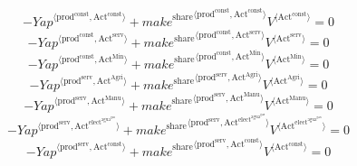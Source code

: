 \begin{equation}
-{{Y\!a\!p}}^{\langle \mathrm{prod}^{\mathrm{const}},\mathrm{Act}^{\mathrm{const}}\rangle} + {{{m\!a\!k\!e}^{\mathrm{share}}}^{\langle \mathrm{\mathrm{prod}^{\mathrm{const}}},\mathrm{\mathrm{Act}^{\mathrm{const}}}\rangle}} {{V}^{\langle \mathrm{Act}^{\mathrm{const}}\rangle}} = 0
\end{equation}
\begin{equation}
-{{Y\!a\!p}}^{\langle \mathrm{prod}^{\mathrm{const}},\mathrm{Act}^{\mathrm{serv}}\rangle} + {{{m\!a\!k\!e}^{\mathrm{share}}}^{\langle \mathrm{\mathrm{prod}^{\mathrm{const}}},\mathrm{\mathrm{Act}^{\mathrm{serv}}}\rangle}} {{V}^{\langle \mathrm{Act}^{\mathrm{serv}}\rangle}} = 0
\end{equation}
\begin{equation}
-{{Y\!a\!p}}^{\langle \mathrm{prod}^{\mathrm{const}},\mathrm{Act}^{\mathrm{Min}}\rangle} + {{{m\!a\!k\!e}^{\mathrm{share}}}^{\langle \mathrm{\mathrm{prod}^{\mathrm{const}}},\mathrm{\mathrm{Act}^{\mathrm{Min}}}\rangle}} {{V}^{\langle \mathrm{Act}^{\mathrm{Min}}\rangle}} = 0
\end{equation}
\begin{equation}
-{{Y\!a\!p}}^{\langle \mathrm{prod}^{\mathrm{serv}},\mathrm{Act}^{\mathrm{Agri}}\rangle} + {{{m\!a\!k\!e}^{\mathrm{share}}}^{\langle \mathrm{\mathrm{prod}^{\mathrm{serv}}},\mathrm{\mathrm{Act}^{\mathrm{Agri}}}\rangle}} {{V}^{\langle \mathrm{Act}^{\mathrm{Agri}}\rangle}} = 0
\end{equation}
\begin{equation}
-{{Y\!a\!p}}^{\langle \mathrm{prod}^{\mathrm{serv}},\mathrm{Act}^{\mathrm{Manu}}\rangle} + {{{m\!a\!k\!e}^{\mathrm{share}}}^{\langle \mathrm{\mathrm{prod}^{\mathrm{serv}}},\mathrm{\mathrm{Act}^{\mathrm{Manu}}}\rangle}} {{V}^{\langle \mathrm{Act}^{\mathrm{Manu}}\rangle}} = 0
\end{equation}
\begin{equation}
-{{Y\!a\!p}}^{\langle \mathrm{prod}^{\mathrm{serv}},\mathrm{Act}^{\mathrm{elect}^{\mathrm{agua}^{\mathrm{gas}}}}\rangle} + {{{m\!a\!k\!e}^{\mathrm{share}}}^{\langle \mathrm{\mathrm{prod}^{\mathrm{serv}}},\mathrm{\mathrm{Act}^{\mathrm{elect}^{\mathrm{agua}^{\mathrm{gas}}}}}\rangle}} {{V}^{\langle \mathrm{Act}^{\mathrm{elect}^{\mathrm{agua}^{\mathrm{gas}}}}\rangle}} = 0
\end{equation}
\begin{equation}
-{{Y\!a\!p}}^{\langle \mathrm{prod}^{\mathrm{serv}},\mathrm{Act}^{\mathrm{const}}\rangle} + {{{m\!a\!k\!e}^{\mathrm{share}}}^{\langle \mathrm{\mathrm{prod}^{\mathrm{serv}}},\mathrm{\mathrm{Act}^{\mathrm{const}}}\rangle}} {{V}^{\langle \mathrm{Act}^{\mathrm{const}}\rangle}} = 0
\end{equation}
